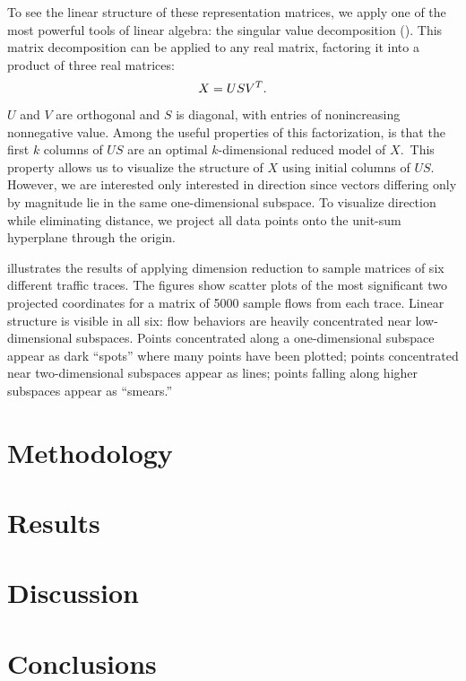 \documentclass[conference]{IEEEtran}
\begin{document}

To see the linear structure of these representation matrices, we apply one of the most powerful tools of linear algebra:
the singular value decomposition ().
This matrix decomposition can be applied to any real matrix, factoring it into a product of three real matrices:
\begin{align}
  X = US{V}^T.
\end{align}
$U$ and $V$ are orthogonal and $S$ is diagonal, with entries of nonincreasing nonnegative value.
Among the useful properties of this factorization, is that the first $k$ columns of $US$ are an optimal $k$-dimensional reduced model of $X$.\,\svdnote
This property allows us to visualize the structure of $X$ using initial columns of $US$.
However, we are interested only interested in direction since
vectors differing only by magnitude lie in the same one-dimensional subspace.
To visualize direction while eliminating distance, we project all data points onto the unit-sum hyperplane through the origin.\projectionnote

 illustrates the results of applying  dimension reduction to sample matrices of six different traffic traces.
The figures show scatter plots of the most significant two projected  coordinates for a matrix of 5000 sample flows from each trace.
Linear structure is visible in all six:
flow behaviors are heavily concentrated near low-dimensional subspaces.
Points concentrated along a one-dimensional subspace appear as dark ``spots'' where many points have been plotted;
points concentrated near two-dimensional subspaces appear as lines;
points falling along higher subspaces appear as ``smears.''

\section{Methodology}

\section{Results}

\section{Discussion}

\section{Conclusions}


\end{document}
